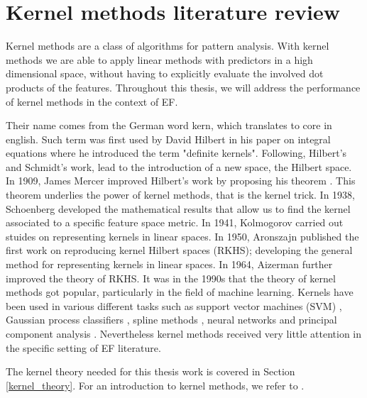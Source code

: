 \section{Kernel methods literature review}
Kernel methods are a class of algorithms for pattern analysis.
With kernel methods we are able to apply linear methods with predictors in a high dimensional space, without having to explicitly evaluate the involved dot products of the features.
Throughout this thesis, we will address the performance of kernel methods in the context of EF.

Their name comes from the German word kern, which translates to core in english. Such term was first used by David Hilbert in his paper on integral equations \cite{hilbert} where he introduced the term "definite kernels". Following, Hilbert's and Schmidt's work, \cite{schmidt} lead to the introduction of a new space, the Hilbert space.
In 1909, James Mercer improved Hilbert's work by proposing his theorem \cite{mercer}. This theorem underlies the power of kernel methods, that is the kernel trick.
In 1938, Schoenberg \cite{schoenberg} developed the mathematical results that allow us to find the kernel associated to a specific feature space metric.
In 1941, Kolmogorov \cite{kolmogorov} carried out stuides on representing kernels in linear spaces.
In 1950, Aronszajn \cite{aronszajn} published the first work on reproducing kernel Hilbert spaces (RKHS); developing the general method for representing kernels in linear spaces.
In 1964, Aizerman \cite{aizerman} further improved the theory of RKHS.
It was in the 1990s that the theory of kernel methods got popular, particularly in the field of machine learning. Kernels have been used in various different tasks such as support vector machines (SVM) \cite{vapnik1, vapnik2}, Gaussian process classifiers \cite{williams}, spline methods \cite{wahba}, neural networks \cite{poggio} and principal component analysis \cite{pca_scholkopf}.
Nevertheless kernel methods received very little attention in the specific setting of EF literature.

The kernel theory needed for this thesis work is covered in Section \ref{kernel_theory}. 
For an introduction to kernel methods, we refer to \cite{learning_with_kernels, hofmann2006review, shawe2004kernel}.

